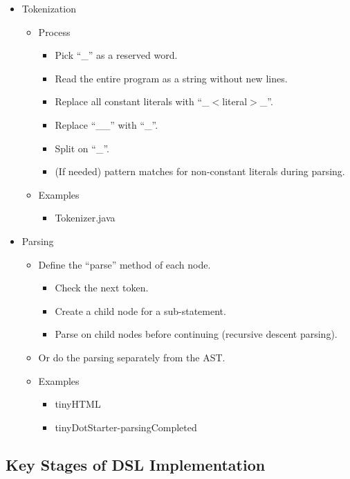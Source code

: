 \documentclass{article}
\begin{document}
\begin{itemize}
    \item Tokenization
    \begin{itemize}
        \item Process
            \begin{itemize}
                \item Pick ``\_'' as a reserved word.
                \item Read the entire program as a string without new lines.
                \item Replace all constant literals with ``\_$<$literal$>$\_''.
                \item Replace ``\_\_'' with ``\_''.
                \item Split on ``\_''.
                \item (If needed) pattern matches for non-constant literals during parsing.
            \end{itemize}
        \item Examples
            \begin{itemize}
                \item Tokenizer.java
            \end{itemize}
    \end{itemize}
    \item Parsing
    \begin{itemize}
        \item Define the ``parse'' method of each node.
        \begin{itemize}
            \item Check the next token.
            \item Create a child node for a sub-statement.
            \item Parse on child nodes before continuing (recursive descent parsing).
        \end{itemize}
        \item Or do the parsing separately from the AST.
        \item Examples
        \begin{itemize}
            \item tinyHTML
            \item tinyDotStarter-parsingCompleted
        \end{itemize}
    \end{itemize}
\end{itemize}

\subsection{Key Stages of DSL Implementation}
\end{document}
